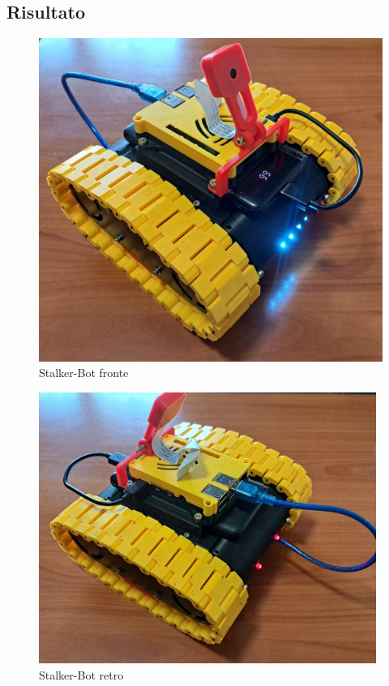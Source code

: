\documentclass[12pt]{report}
\begin{document}
\subsection{Risultato}

\FloatBarrier
\begin{figure}[!h]
    \centering
    \includegraphics[width=13cm]{images/robot-front.jpg}
    \caption{Stalker-Bot fronte}
\end{figure}

\begin{figure}[!h]
    \centering
    \includegraphics[width=11cm]{images/robot-back.jpg}
    \caption{Stalker-Bot retro}
\end{figure}
\end{document}
